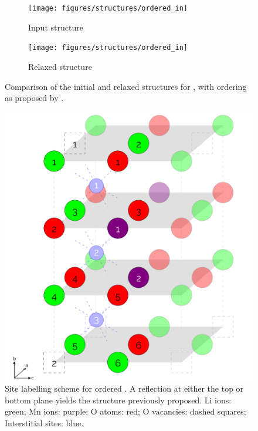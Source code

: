 \begin{figure}[p]
\centering

\begin{subfigure}{0.5\textwidth}
\centering
\texttt{[image: figures/structures/ordered\_in]}
\caption{Input structure\cite{Diaz-Lopez2017}}
\end{subfigure}%
\begin{subfigure}{0.5\textwidth}
\centering
\texttt{[image: figures/structures/ordered\_in]}
\caption{Relaxed structure}
\end{subfigure}

\caption[Comparison of the initial and relaxed structures for ordered ]{Comparison of the initial and relaxed structures for , with ordering as proposed by \citet{Diaz-Lopez2017}.}
\end{figure}

\newpage
\begin{figure}[h] %
\centering
\includegraphics[height = 0.55\textheight]{figures/orderedlabels/orderedlabels}
\caption[Site labelling scheme for ordered ]{Site labelling scheme for ordered . A reflection at either the top or bottom plane yields the structure previously proposed.\cite{Diaz-Lopez2017} Li ions: green; Mn ions: purple; O atoms: red; O vacancies: dashed squares; Interstitial sites: blue.
}
\label{fig:orderedlabel}
\end{figure}

